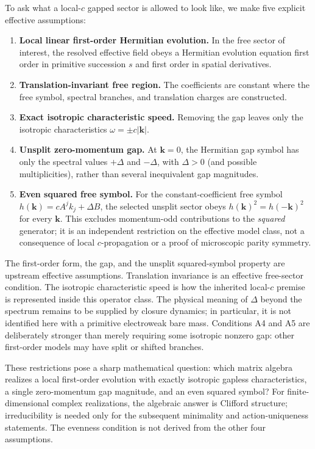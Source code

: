 \documentclass[11pt]{article}
\theoremstyle{definition}
\begin{document}
To ask what a local-$c$ gapped sector is allowed to look like, we make five explicit effective
assumptions:
\begin{enumerate}[leftmargin=*,label=\textbf{A\arabic*:},ref=A\arabic*]
\item\label{ass:qf-A1} \textbf{Local linear first-order Hermitian evolution.}  In the free sector of interest, the
resolved effective field obeys a Hermitian evolution equation first order in primitive
succession $s$ and first order in spatial derivatives.
\item\label{ass:qf-A2} \textbf{Translation-invariant free region.}  The coefficients are constant where the
free symbol, spectral branches, and translation charges are constructed.
\item\label{ass:qf-A3} \textbf{Exact isotropic characteristic speed.}  Removing the gap leaves only the
isotropic characteristics $\omega=\pm c|\mathbf k|$.
\item\label{ass:qf-A4} \textbf{Unsplit zero-momentum gap.}  At $\mathbf k=0$, the Hermitian gap
symbol has only the spectral values $+\Delta$ and $-\Delta$, with $\Delta>0$
(and possible multiplicities), rather than several inequivalent gap magnitudes.
\item\label{ass:qf-A5} \textbf{Even squared free symbol.}  For the constant-coefficient free
symbol $h(\mathbf k)=cA^jk_j+\Delta B$, the selected unsplit sector obeys
$h(\mathbf k)^2=h(-\mathbf k)^2$ for every $\mathbf k$.  This excludes
momentum-odd contributions to the \emph{squared} generator; it is an
independent restriction on the effective model class, not a consequence of local
$c$-propagation or a proof of microscopic parity symmetry.
\end{enumerate}

The first-order form, the gap, and the unsplit squared-symbol property are upstream
effective assumptions.  Translation invariance is an effective free-sector condition.  The
isotropic characteristic speed is how the inherited local-$c$ premise is represented inside
this operator class.  The physical meaning of $\Delta$ beyond the spectrum remains to be
supplied by closure dynamics; in particular, it is not identified here with a primitive
electroweak bare mass.  Conditions A4 and A5 are deliberately stronger than merely requiring
some isotropic nonzero gap: other first-order models may have split or shifted branches.

These restrictions pose a sharp mathematical question: which matrix algebra realizes a
local first-order evolution with exactly isotropic gapless characteristics, a single
zero-momentum gap magnitude, and an even squared symbol?  For finite-dimensional complex realizations, the algebraic answer is Clifford
structure; irreducibility is needed only for the subsequent minimality and
action-uniqueness statements.  The evenness condition is not derived
from the other four assumptions.
\end{document}
